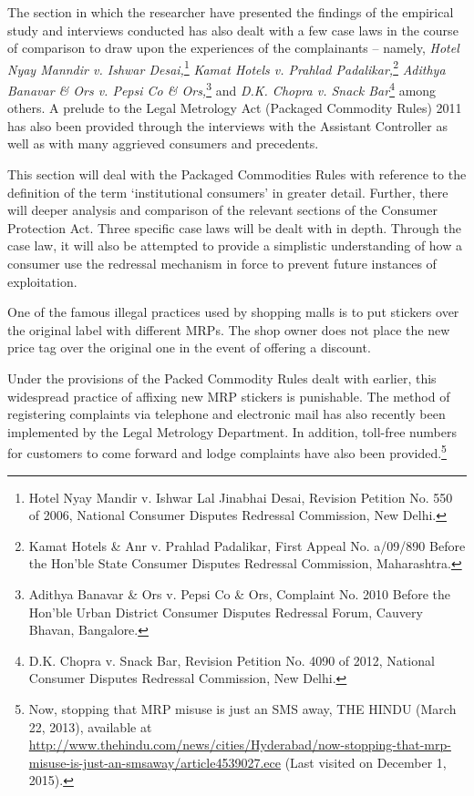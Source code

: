 \begin{multicols}{2}
\vspace{-.2cm}

\noi
The section in which the researcher have presented the findings of the empirical study and
interviews conducted has also dealt with a few case laws in the course of comparison to draw
upon the experiences of the complainants – namely, \textit{Hotel Nyay Manndir v. Ishwar Desai,}\footnote{Hotel Nyay Mandir v. Ishwar Lal Jinabhai Desai, Revision Petition No. 550 of 2006, National Consumer Disputes Redressal Commission, New Delhi.} \textit{Kamat Hotels v. Prahlad Padalikar,}\footnote{Kamat Hotels \& Anr v. Prahlad Padalikar, First Appeal No. a/09/890 Before the Hon’ble State Consumer Disputes Redressal Commission, Maharashtra.} \textit{Adithya Banavar \& Ors v. Pepsi Co \& Ors,}\footnote{Adithya Banavar \& Ors v. Pepsi Co \& Ors, Complaint No. 2010 Before the Hon’ble Urban District Consumer Disputes Redressal Forum, Cauvery Bhavan, Bangalore.} and \textit{D.K. Chopra v. Snack Bar}\footnote{D.K. Chopra v. Snack Bar, Revision Petition No. 4090 of 2012, National Consumer Disputes Redressal Commission, New Delhi.} among others. A prelude to the Legal Metrology Act (Packaged Commodity Rules) 2011 has also been provided through the interviews with the Assistant Controller as well as with many aggrieved consumers and precedents.

\vspace{-.2cm}

\noi
This section will deal with the Packaged Commodities Rules with reference to the definition
of the term ‘institutional consumers’ in greater detail. Further, there will deeper analysis and
comparison of the relevant sections of the Consumer Protection Act. Three specific case laws
will be dealt with in depth. Through the case law, it will also be attempted to provide a
simplistic understanding of how a consumer use the redressal mechanism in force to prevent
future instances of exploitation.

\vspace{-.2cm}

\noi
One of the famous illegal practices used by shopping malls is to put stickers over the original
label with different MRPs. The shop owner does not place the new price tag over the original
one in the event of offering a discount.

\vspace{-.15cm}

\noi
Under the provisions of the Packed Commodity Rules dealt with earlier, this widespread
practice of affixing new MRP stickers is punishable. The method of registering complaints via
telephone and electronic mail has also recently been implemented by the Legal Metrology
Department. In addition, toll-free numbers for customers to come forward and lodge
complaints have also been provided.\footnote{Now, stopping that MRP misuse is just an SMS away, THE HINDU (March 22, 2013), available at  \url{http://www.thehindu.com/news/cities/Hyderabad/now-stopping-that-mrp-misuse-is-just-an-smsaway/article4539027.ece} (Last visited on December 1, 2015).}


\end{multicols}
